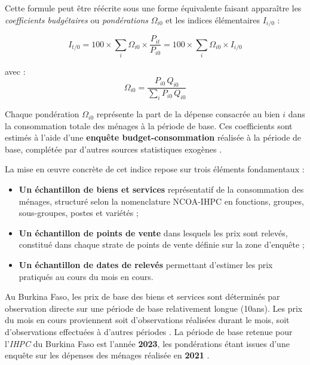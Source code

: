 \documentclass[
12pt,          %
a4paper,       %
oneside,       %
openright      %
]{report}
\newcommand{\IHPC}{\textit{IHPC}}
\begin{document}
Cette formule peut être réécrite sous une forme équivalente faisant 
apparaître les \textit{coefficients budgétaires} ou \textit{pondérations} 
$\Omega_{i0}$ et les indices élémentaires $I_{i/0}$ \citep{afristat2022} :

\begin{equation}
	I_{t/0} = 100 \times \sum_{i} \Omega_{i0} \times \frac{P_{it}}{P_{i0}}
	= 100 \times \sum_{i} \Omega_{i0} \times I_{i/0}
	\label{eq:laspeyres2}
\end{equation}

avec :
\begin{equation}
	\Omega_{i0} = \frac{P_{i0}\, Q_{i0}}{\displaystyle\sum_{i} P_{i0}\, Q_{i0}}
	\label{eq:ponderations}
\end{equation}

Chaque pondération $\Omega_{i0}$ représente la part de la dépense 
consacrée au bien $i$ dans la consommation totale des ménages à la 
période de base. Ces coefficients sont estimés à l'aide d'une 
\textbf{enquête budget-consommation} réalisée à la période de base, 
complétée par d'autres sources statistiques exogènes \citep{afristat2022}.

La mise en \oe{}uvre concrète de cet indice repose sur trois éléments 
fondamentaux \citep{afristat2022} :

\begin{itemize}
	\item \textbf{Un échantillon de biens et services} représentatif 
	de la consommation des ménages, structuré selon la nomenclature 
	NCOA-IHPC en fonctions, groupes, sous-groupes, postes et variétés ;
	
	\item \textbf{Un échantillon de points de vente} dans lesquels 
	les prix sont relevés, constitué dans chaque strate de points de 
	vente définie sur la zone d'enquête ;
	
	\item \textbf{Un échantillon de dates de relevés} permettant 
	d'estimer les prix pratiqués au cours du mois en cours.
\end{itemize}

Au Burkina Faso, les prix de base des biens et services sont déterminés 
par observation directe sur une période de base relativement longue (10ans). 
Les prix du mois en cours proviennent soit d'observations réalisées 
durant le mois, soit d'observations effectuées à d'autres périodes 
\citep{afristat2022}. La période de base retenue pour l'\IHPC{} 
du Burkina Faso est l'année \textbf{2023}, les pondérations étant 
issues d'une enquête sur les dépenses des ménages réalisée en 
\textbf{2021} \citep{insd2025}.
	
\end{document}
